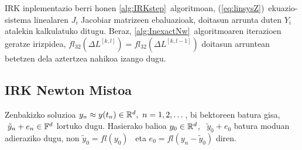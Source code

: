 IRK inplementazio berri honen \ref{alg:IRKstep}~algoritmoan, (\ref{eq:linsysZ})~ekuazio-sistema linealaren  $J_i$ Jacobiar matrizeen ebaluazioak, doitasun arrunta duten $Y_i$ atalekin kalkulatuko ditugu. Beraz, \ref{alg:InexactNw}~algoritmoaren iterazioen geratze irizpidea, $fl_{32}(\Delta L^{[k,l]})=fl_{32}(\Delta L^{[k,l-1]})$ doitasun arruntean betetzen dela aztertzea nahikoa izango dugu.  

\subsection{IRK Newton Mistoa}
\label{ss:ss762}

Zenbakizko soluzioa $y_n \approx y(t_n) \in \mathbb{R}^{d}, \ n=1,2,\dots$, bi bektoreen batura gisa, $ \ \tilde{y}_n+e_n \in \mathbb{F}^{d}$ lortuko dugu. Hasierako balioa $y_0 \in \mathbb{R}^{d}$, \ $\tilde{y}_0+e_0$ batura moduan adieraziko dugu, non $\tilde{y}_0=fl(y_0)$~ eta $e_0=fl(y_n-\tilde{y}_0)$ diren. 


